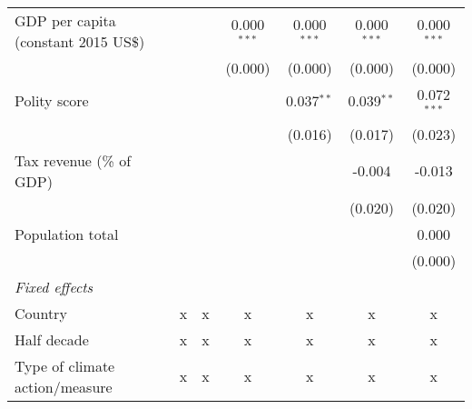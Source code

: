\begin{tabular}{lcccccc}
   GDP per capita (constant 2015 US\$)                                                                &         &                & 0.000$^{***}$  & 0.000$^{***}$  & 0.000$^{***}$  & 0.000$^{***}$\\   
                                                                                                      &         &                & (0.000)        & (0.000)        & (0.000)        & (0.000)\\   
   Polity score                                                                                       &         &                &                & 0.037$^{**}$   & 0.039$^{**}$   & 0.072$^{***}$\\   
                                                                                                      &         &                &                & (0.016)        & (0.017)        & (0.023)\\   
   Tax revenue (\% of GDP)                                                                            &         &                &                &                & -0.004         & -0.013\\   
                                                                                                      &         &                &                &                & (0.020)        & (0.020)\\   
   Population total                                                                                   &         &                &                &                &                & 0.000\\   
                                                                                                      &         &                &                &                &                & (0.000)\\   
   \emph{Fixed effects}\\
   Country                                                                                            & x       & x              & x              & x              & x              & x\\  
   Half decade                                                                                        & x       & x              & x              & x              & x              & x\\  
   Type of climate action/measure                                                                     & x       & x              & x              & x              & x              & x\\  

\end{tabular}

